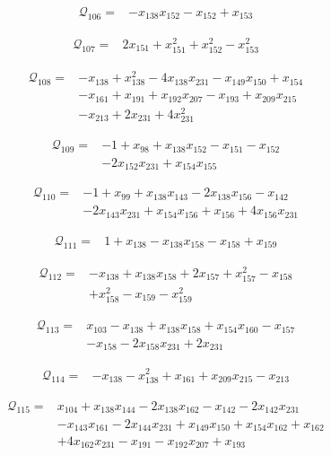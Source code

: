 \begin{align*}
\mathcal{Q}_{106}={}&-x_{138}x_{152}-x_{152}+x_{153}
\end{align*}

\begin{align*}
\mathcal{Q}_{107}={}&2x_{151}+x_{151}^{2}+x_{152}^{2}-x_{153}^{2}
\end{align*}

\begin{align*}
\mathcal{Q}_{108}={}&-x_{138}+x_{138}^{2}-4x_{138}x_{231}-x_{149}x_{150}+x_{154}\\
&-x_{161}+x_{191}+x_{192}x_{207}-x_{193}+x_{209}x_{215}\\
&-x_{213}+2x_{231}+4x_{231}^{2}
\end{align*}

\begin{align*}
\mathcal{Q}_{109}={}&-1+x_{98}+x_{138}x_{152}-x_{151}-x_{152}\\
&-2x_{152}x_{231}+x_{154}x_{155}
\end{align*}

\begin{align*}
\mathcal{Q}_{110}={}&-1+x_{99}+x_{138}x_{143}-2x_{138}x_{156}-x_{142}\\
&-2x_{143}x_{231}+x_{154}x_{156}+x_{156}+4x_{156}x_{231}
\end{align*}

\begin{align*}
\mathcal{Q}_{111}={}&1+x_{138}-x_{138}x_{158}-x_{158}+x_{159}
\end{align*}

\begin{align*}
\mathcal{Q}_{112}={}&-x_{138}+x_{138}x_{158}+2x_{157}+x_{157}^{2}-x_{158}\\
&+x_{158}^{2}-x_{159}-x_{159}^{2}
\end{align*}

\begin{align*}
\mathcal{Q}_{113}={}&x_{103}-x_{138}+x_{138}x_{158}+x_{154}x_{160}-x_{157}\\
&-x_{158}-2x_{158}x_{231}+2x_{231}
\end{align*}

\begin{align*}
\mathcal{Q}_{114}={}&-x_{138}-x_{138}^{2}+x_{161}+x_{209}x_{215}-x_{213}
\end{align*}

\begin{align*}
\mathcal{Q}_{115}={}&x_{104}+x_{138}x_{144}-2x_{138}x_{162}-x_{142}-2x_{142}x_{231}\\
&-x_{143}x_{161}-2x_{144}x_{231}+x_{149}x_{150}+x_{154}x_{162}+x_{162}\\
&+4x_{162}x_{231}-x_{191}-x_{192}x_{207}+x_{193}
\end{align*}

